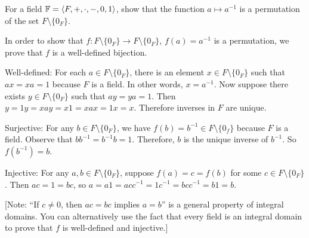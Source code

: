 \begin{problem}[Golan 12]
For a field $\mathbb{F} = \langle F,+,\cdot, -, 0, 1\rangle$, 
show that the function $a \mapsto a^{-1}$ is a 
permutation of the set $F \setminus \{0_F\}$.
\end{problem}
\smallskip
\begin{solution}

In order to show that $f:F\setminus \{0_F\}\rightarrow F\setminus \{0_F\}$, $f(a)=a^{-1}$ is a permutation, we prove that $f$ is a well-defined bijection. 

Well-defined: For each $a\in F\setminus \{0_F\}$, there is an element $x\in F\setminus \{0_F\}$ such that $ax=xa=1$ because $F$ is a field. In other words, $x=a^{-1}$. Now suppose there exists $y\in  F\setminus \{0_F\}$ such that $ay=ya=1$. Then $y = 1y = xay = x1 = xax = 1x = x$. Therefore inverses in $F$ are unique. 


Surjective: For any $b\in F\setminus \{0_F\}$, we have $f(b)=b^{-1}\in F\setminus \{0_f\}$ because $F$ is a field. Observe that $bb^{-1}=b^{-1}b=1$. Therefore, $b$ is the unique inverse of $b^{-1}$. So $f(b^{-1}) = b$. %

Injective: For any $a,b\in F\setminus \{0_F\}$, suppose $f(a) = c = f(b)$ for some $c\in F\setminus \{0_F\}$. Then $ac = 1 =bc $, so $a = a1 = acc^{-1} = 1c^{-1} = bcc^{-1} = b1 = b$.

[Note: ``If $c\neq 0$, then $ac = bc$ implies $a=b$'' is a general property of integral domains. You can alternatively use the fact that every field is an integral domain to prove that $f$ is well-defined and injective.]

\end{solution}
\probskip




